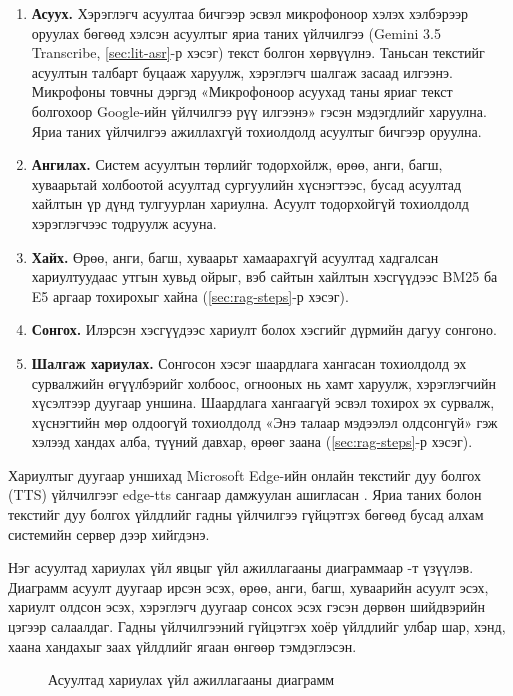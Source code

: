 \begin{enumerate}
    \item \textbf{Асуух.} Хэрэглэгч асуултаа бичгээр эсвэл микрофоноор хэлэх хэлбэрээр оруулах бөгөөд хэлсэн асуултыг яриа таних үйлчилгээ (Gemini 3.5 Transcribe, \ref{sec:lit-asr}-р хэсэг) текст болгон хөрвүүлнэ. Таньсан текстийг асуултын талбарт буцааж харуулж, хэрэглэгч шалгаж засаад илгээнэ. Микрофоны товчны дэргэд «Микрофоноор асуухад таны яриаг текст болгохоор Google-ийн үйлчилгээ рүү илгээнэ» гэсэн мэдэгдлийг харуулна. Яриа таних үйлчилгээ ажиллахгүй тохиолдолд асуултыг бичгээр оруулна.
    \item \textbf{Ангилах.} Систем асуултын төрлийг тодорхойлж, өрөө, анги, багш, хуваарьтай холбоотой асуултад сургуулийн хүснэгтээс, бусад асуултад хайлтын үр дүнд тулгуурлан хариулна. Асуулт тодорхойгүй тохиолдолд хэрэглэгчээс тодруулж асууна.
    \item \textbf{Хайх.} Өрөө, анги, багш, хуваарьт хамаарахгүй асуултад хадгалсан хариултуудаас утгын хувьд ойрыг, вэб сайтын хайлтын хэсгүүдээс BM25 ба E5 аргаар тохирохыг хайна (\ref{sec:rag-steps}-р хэсэг).
    \item \textbf{Сонгох.} Илэрсэн хэсгүүдээс хариулт болох хэсгийг дүрмийн дагуу сонгоно.
    \item \textbf{Шалгаж хариулах.} Сонгосон хэсэг шаардлага хангасан тохиолдолд эх сурвалжийн өгүүлбэрийг холбоос, огнооных нь хамт харуулж, хэрэглэгчийн хүсэлтээр дуугаар уншина. Шаардлага хангаагүй эсвэл тохирох эх сурвалж, хүснэгтийн мөр олдоогүй тохиолдолд «Энэ талаар мэдээлэл олдсонгүй» гэж хэлээд хандах алба, түүний давхар, өрөөг заана (\ref{sec:rag-steps}-р хэсэг).
\end{enumerate}

Хариултыг дуугаар уншихад Microsoft Edge-ийн онлайн текстийг дуу болгох (\acs{TTS}) үйлчилгээг edge-tts сангаар дамжуулан ашигласан \cite{edge_tts}. Яриа таних болон текстийг дуу болгох үйлдлийг гадны үйлчилгээ гүйцэтгэх бөгөөд бусад алхам системийн сервер дээр хийгдэнэ.

Нэг асуултад хариулах үйл явцыг үйл ажиллагааны диаграммаар -т үзүүлэв. Диаграмм асуулт дуугаар ирсэн эсэх, өрөө, анги, багш, хуваарийн асуулт эсэх, хариулт олдсон эсэх, хэрэглэгч дуугаар сонсох эсэх гэсэн дөрвөн шийдвэрийн цэгээр салаалдаг. Гадны үйлчилгээний гүйцэтгэх хоёр үйлдлийг улбар шар, хэнд, хаана хандахыг заах үйлдлийг ягаан өнгөөр тэмдэглэсэн.

\begin{figure}[tbp]
\centering
{}
\caption{Асуултад хариулах үйл ажиллагааны диаграмм}
\label{fig:activity}
\end{figure}


